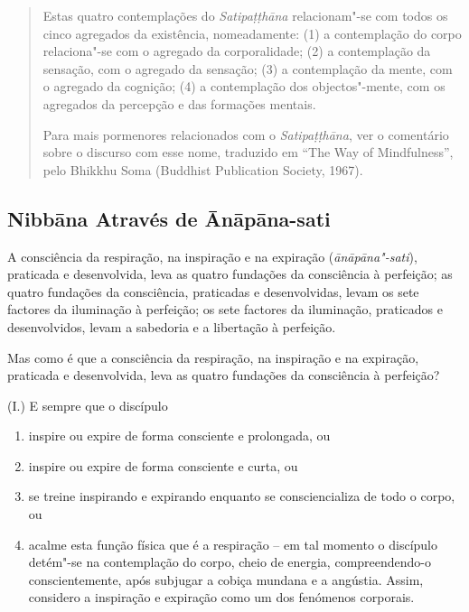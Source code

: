 \begin{quote}
  Estas quatro contemplações do \emph{Satipa\d{t}\d{t}hāna} relacionam"-se com
  todos os cinco agregados da existência, nomeadamente: (1) a contemplação do
  corpo relaciona"-se com o agregado da corporalidade; (2) a contemplação da
  sensação, com o agregado da sensação; (3) a contemplação da mente, com o
  agregado da cognição; (4) a contemplação dos objectos"-mente, com os agregados
  da percepção e das formações mentais.

  Para mais pormenores relacionados com o \emph{Satipa\d{t}\d{t}hāna}, ver o
  comentário sobre o discurso com esse nome, traduzido em “The Way of
  Mindfulness”, pelo Bhikkhu Soma (Buddhist Publication Society, 1967).
\end{quote}

\subsection{Nibbāna Através de Ānāpāna-sati}

A consciência da respiração, na inspiração e na expiração (\emph{ānāpāna"-sati}),
praticada e desenvolvida, leva as quatro fundações da consciência à perfeição;
as quatro fundações da consciência, praticadas e desenvolvidas, levam os sete
factores da iluminação à perfeição; os sete factores da iluminação, praticados e
desenvolvidos, levam a sabedoria e a libertação à perfeição.

Mas como é que a consciência da respiração, na inspiração e na expiração,
praticada e desenvolvida, leva as quatro fundações da consciência à perfeição?

(I.) E sempre que o discípulo

\begin{enumerate}
  \item inspire ou expire de forma consciente e prolongada, ou

  \item inspire ou expire de forma consciente e curta, ou

  \item se treine inspirando e expirando enquanto se consciencializa de todo o
        corpo, ou

  \item acalme esta função física que é a respiração -- em tal momento o
        discípulo detém"-se na contemplação do corpo, cheio de energia,
        compreendendo-o conscientemente, após subjugar a cobiça mundana e a
        angústia. Assim, considero a inspiração e expiração como um dos
        fenómenos corporais.
\end{enumerate}


